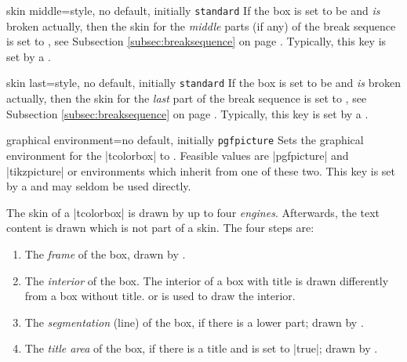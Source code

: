 \begin{docTcbKey}{skin middle}{=}{style, no default, initially \texttt{standard}}
  If the box is set to be  and \emph{is} broken actually,
  then the skin for the \emph{middle} parts (if any) of the break sequence
  is set to , see Subsection \ref{subsec:breaksequence} on page \pageref{subsec:breaksequence}.
  Typically, this key is set by a .
\end{docTcbKey}


\begin{docTcbKey}{skin last}{=}{style, no default, initially \texttt{standard}}
  If the box is set to be  and \emph{is} broken actually,
  then the skin for the \emph{last} part of the break sequence
  is set to , see Subsection \ref{subsec:breaksequence} on page \pageref{subsec:breaksequence}.
  Typically, this key is set by a .
\end{docTcbKey}


\clearpage

\begin{docTcbKey}{graphical environment}{=}{no default, initially \texttt{pgfpicture}}
  Sets the graphical environment for the |tcolorbox| to .
  Feasible values are |pgfpicture| and |tikzpicture| or environments which
  inherit from one of these two. This key is set by a  and
  may seldom be used directly.
\end{docTcbKey}

The skin of a |tcolorbox| is drawn by up to four \emph{engines}.
Afterwards, the text content is drawn which is not part of a skin.
The four steps are:
\begin{enumerate}
\item The \emph{frame} of the box, drawn by .
\item The \emph{interior} of the box. The interior of a box with title is
  drawn differently from a box without title.
   or 
  is used to draw the interior.
\item The \emph{segmentation} (line) of the box, if there is a lower part;
  drawn by .
\item The \emph{title area} of the box, if there is a title and
   is set to |true|; drawn
  by .
\end{enumerate}

